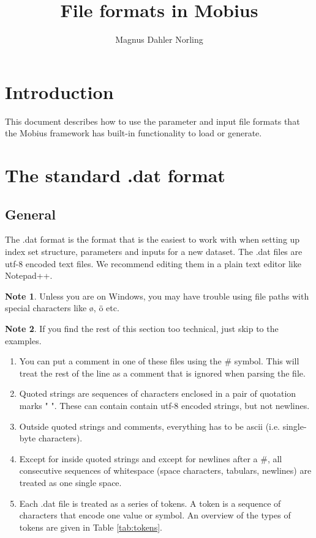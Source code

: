 \documentclass[11pt]{article}
\title{File formats in Mobius}
\author{Magnus Dahler Norling}
\theoremstyle{definition}
\newtheorem{mynote}{Note}
\newenvironment{note}%
  {\begin{lrbox}{\notebox}%
   \begin{minipage}{\dimexpr\linewidth-2\fboxsep}
   \begin{mynote}}%
  {\end{mynote}%
   \end{minipage}%
   \end{lrbox}%
   \begin{trivlist}
     \item[]\colorbox{silver}{\usebox\notebox}
   \end{trivlist}}
\begin{document}
\maketitle

\tableofcontents

\section{Introduction}

This document describes how to use the parameter and input file formats that the Mobius framework has built-in functionality to load or generate.

\section{The standard .dat format}

\subsection{General}
The .dat format is the format that is the easiest to work with when setting up index set structure, parameters and inputs for a new dataset. The .dat files are utf-8 encoded text files. We recommend editing them in a plain text editor like Notepad++.

\begin{note}
Unless you are on Windows, you may have trouble using file paths with special characters like \o, \"{o} etc.
\end{note}

\begin{note}
If you find the rest of this section too technical, just skip to the examples.
\end{note}

\begin{enumerate}[i]
\item You can put a comment in one of these files using the \# symbol. This will treat the rest of the line as a comment that is ignored when parsing the file.
\item Quoted strings are sequences of characters enclosed in a pair of quotation marks " ". These can contain contain utf-8 encoded strings, but not newlines.
\item Outside quoted strings and comments, everything has to be ascii (i.e. single-byte characters).
\item Except for inside quoted strings and except for newlines after a \#, all consecutive sequences of whitespace (space characters, tabulars, newlines) are treated as one single space.
\item Each .dat file is treated as a series of tokens. A token is a sequence of characters that encode one value or symbol. An overview of the types of tokens are given in Table \ref{tab:tokens}.
\end{enumerate}
\end{document}
